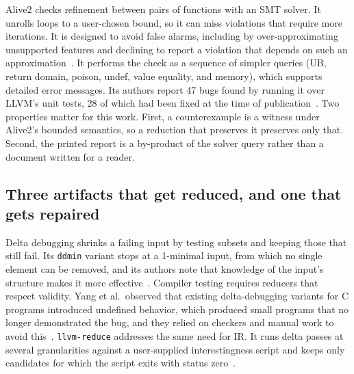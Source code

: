 \documentclass[conference]{IEEEtran}
\begin{document}
Alive2 checks refinement between pairs of functions with an SMT solver. It unrolls loops to a user-chosen bound, so it can miss violations that require more iterations. It is designed to avoid false alarms, including by over-approximating unsupported features and declining to report a violation that depends on such an approximation~\cite{lopes2021alive2}. It performs the check as a sequence of simpler queries (UB, return domain, poison, undef, value equality, and memory), which supports detailed error messages. Its authors report 47 bugs found by running it over LLVM's unit tests, 28 of which had been fixed at the time of publication~\cite{lopes2021alive2}. Two properties matter for this work. First, a counterexample is a witness under Alive2's bounded semantics, so a reduction that preserves it preserves only that. Second, the printed report is a by-product of the solver query rather than a document written for a reader.

\subsection{Three artifacts that get reduced, and one that gets repaired}

Delta debugging shrinks a failing input by testing subsets and keeping those that still fail. Its \texttt{ddmin} variant stops at a 1-minimal input, from which no single element can be removed, and its authors note that knowledge of the input's structure makes it more effective~\cite{zeller2002dd}. Compiler testing requires reducers that respect validity. Yang et al.\ observed that existing delta-debugging variants for C programs introduced undefined behavior, which produced small programs that no longer demonstrated the bug, and they relied on checkers and manual work to avoid this~\cite{yang2011csmith}. \texttt{llvm-reduce} addresses the same need for IR. It runs delta passes at several granularities against a user-supplied interestingness script and keeps only candidates for which the script exits with status zero~\cite{llvmreducedoc}.
\end{document}
